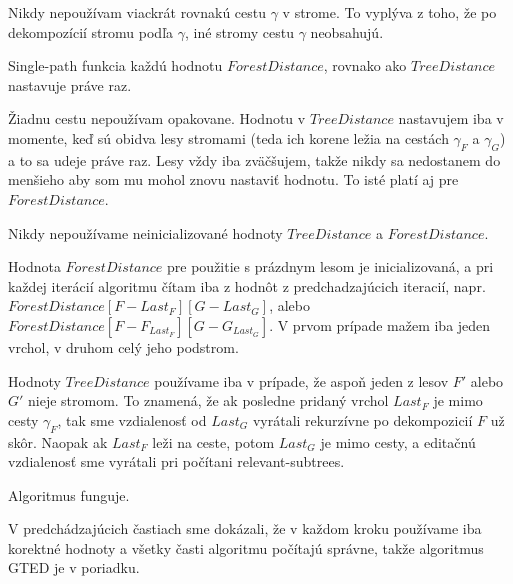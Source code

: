 \begin{pozn}
  Nikdy nepoužívam viackrát rovnakú cestu $\gamma$ v strome. To vyplýva z toho, že po dekompozícií
  stromu podľa $\gamma$, iné stromy cestu $\gamma$ neobsahujú.
\end{pozn}

\begin{pozn}
  Single-path funkcia každú hodnotu $ForestDistance$, rovnako ako $TreeDistance$ nastavuje
  práve raz.
\end{pozn}

\begin{dukaz}
  Žiadnu cestu nepoužívam opakovane. Hodnotu v $TreeDistance$ nastavujem iba v momente,
  keď sú obidva lesy stromami (teda ich korene ležia na cestách $\gamma_{F}$ a $\gamma_{G}$)
  a to sa udeje práve raz.
  Lesy vždy iba zväčšujem, takže nikdy sa nedostanem do menšieho aby som mu mohol znovu nastaviť
  hodnotu. To isté platí aj pre $ForestDistance$.
\end{dukaz}

\begin{lemma}
  Nikdy nepoužívame neinicializované hodnoty $TreeDistance$ a $ForestDistance$.
\end{lemma}

\begin{dukaz}
  Hodnota $ForestDistance$ pre použitie s prázdnym lesom je inicializovaná, a pri každej iterácií
  algoritmu čítam iba z hodnôt z predchadzajúcich iteracií, napr.
  $ForestDistance[F - Last_{F}][G - Last_{G}]$, alebo $ForestDistance[F - F_{Last_{F}}][G - G_{Last_{G}}]$.
  V prvom prípade mažem iba jeden vrchol, v druhom celý jeho podstrom.

  Hodnoty $TreeDistance$ používame iba v prípade, že aspoň jeden z lesov $F'$ alebo $G'$ nieje stromom.
  To znamená, že ak posledne pridaný vrchol $Last_{F}$ je mimo cesty $\gamma_{F}$, tak sme vzdialenosť
  od $Last_{G}$ vyrátali rekurzívne po dekompozicií $F$ už skôr.
  Naopak ak $Last_{F}$ leži na ceste, potom $Last_{G}$ je mimo cesty, a editačnú vzdialenosť
  sme vyrátali pri počítani relevant-subtrees.
\end{dukaz}

\begin{dusl}
  Algoritmus funguje.
\end{dusl}

\begin{dukaz}
  V predchádzajúcich častiach sme dokázali, že v každom kroku používame iba korektné hodnoty a
  všetky časti algoritmu počítajú správne, takže algoritmus GTED je v poriadku.
\end{dukaz}

